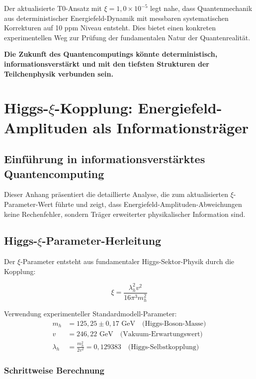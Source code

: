 	Der aktualisierte T0-Ansatz mit $\xi = 1,0 \times 10^{-5}$ legt nahe, dass Quantenmechanik aus deterministischer Energiefeld-Dynamik mit messbaren systematischen Korrekturen auf 10 ppm Niveau entsteht. Dies bietet einen konkreten experimentellen Weg zur Prüfung der fundamentalen Natur der Quantenrealität.
	
	\textbf{Die Zukunft des Quantencomputings könnte deterministisch, informationsverstärkt und mit den tiefsten Strukturen der Teilchenphysik verbunden sein.}
	
	\appendix
	
	\section{Higgs-$\xi$-Kopplung: Energiefeld-Amplituden als Informationsträger}
	
	\subsection{Einführung in informationsverstärktes Quantencomputing}
	
	Dieser Anhang präsentiert die detaillierte Analyse, die zum aktualisierten $\xi$-Parameter-Wert führte und zeigt, dass Energiefeld-Amplituden-Abweichungen keine Rechenfehler, sondern Träger erweiterter physikalischer Information sind.
	
	\subsection{Higgs-$\xi$-Parameter-Herleitung}
	
	Der $\xi$-Parameter entsteht aus fundamentaler Higgs-Sektor-Physik durch die Kopplung:
	
	\begin{equation}
		\xi = \frac{\lambda_h^2 v^2}{16\pi^3 m_h^2}
		\label{eq:higgs_xi_appendix}
	\end{equation}
	
	Verwendung experimenteller Standardmodell-Parameter:
	\begin{align}
		m_h &= 125,25 \pm 0,17 \text{ GeV} \quad \text{(Higgs-Boson-Masse)} \\
		v &= 246,22 \text{ GeV} \quad \text{(Vakuum-Erwartungswert)} \\
		\lambda_h &= \frac{m_h^2}{2v^2} = 0,129383 \quad \text{(Higgs-Selbstkopplung)}
	\end{align}
	
	\subsubsection{Schrittweise Berechnung}
	
